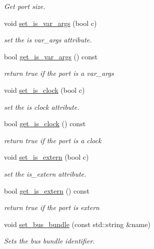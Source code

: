 \begin{DoxyCompactItemize}
\begin{DoxyCompactList}\small\item\em Get port size. \end{DoxyCompactList}\item 
void \hyperlink{structport__o_ae411aad0040aacb12b677eeab6ba6271}{set\+\_\+is\+\_\+var\+\_\+args} (bool c)
\begin{DoxyCompactList}\small\item\em set the is var\+\_\+args attribute. \end{DoxyCompactList}\item 
bool \hyperlink{structport__o_a91f3144e9d18e6e282e4dad12912d431}{get\+\_\+is\+\_\+var\+\_\+args} () const
\begin{DoxyCompactList}\small\item\em return true if the port is a var\+\_\+args \end{DoxyCompactList}\item 
void \hyperlink{structport__o_a0023e6ea2769503f76f03a5c0c98c5ca}{set\+\_\+is\+\_\+clock} (bool c)
\begin{DoxyCompactList}\small\item\em set the is clock attribute. \end{DoxyCompactList}\item 
bool \hyperlink{structport__o_a952e3f6145d24998df4cabdfcf928dd0}{get\+\_\+is\+\_\+clock} () const
\begin{DoxyCompactList}\small\item\em return true if the port is a clock \end{DoxyCompactList}\item 
void \hyperlink{structport__o_ae7d22e9b0c83431ae0ae37e745df0678}{set\+\_\+is\+\_\+extern} (bool c)
\begin{DoxyCompactList}\small\item\em set the is\+\_\+extern attribute. \end{DoxyCompactList}\item 
bool \hyperlink{structport__o_ace21d5b503cddb14492cd553e787c093}{get\+\_\+is\+\_\+extern} () const
\begin{DoxyCompactList}\small\item\em return true if the port is extern \end{DoxyCompactList}\item 
void \hyperlink{structport__o_ae08ac5c248b158f0b81fb65d859d4406}{set\+\_\+bus\+\_\+bundle} (const std\+::string \&name)
\begin{DoxyCompactList}\small\item\em Sets the bus bundle identifier. \end{DoxyCompactList}\item 

\end{DoxyCompactItemize}
